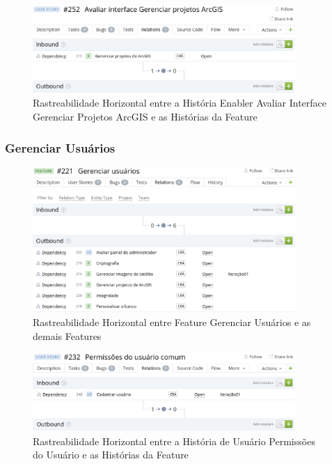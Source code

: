   \begin{figure}[!htb]
    \centering
    \includegraphics[width=10cm, keepaspectratio=false]{figuras/rastreabilidade/horizontal/gerenciar_projetos/historia_avaliar_projeto.eps}
    \caption{Rastreabilidade Horizontal entre a História Enabler Avaliar Interface Gerenciar Projetos ArcGIS e as Histórias da Feature}
  \end{figure}

  \clearpage

\subsubsection{Gerenciar Usuários}

  \begin{figure}[!htb]
    \centering
    \includegraphics[width=10cm, keepaspectratio=false]{figuras/rastreabilidade/horizontal/gerenciar_usuario/feature_gerencia_usuario.eps}
    \caption{Rastreabilidade Horizontal entre Feature Gerenciar Usuários e as demais Features}
  \end{figure}

  \begin{figure}[!htb]
    \centering
    \includegraphics[width=10cm, keepaspectratio=false]{figuras/rastreabilidade/horizontal/gerenciar_usuario/historia_permissoes.eps}
    \caption{Rastreabilidade Horizontal entre a História de Usuário Permissões do Usuário e as Histórias da Feature}
  \end{figure}

